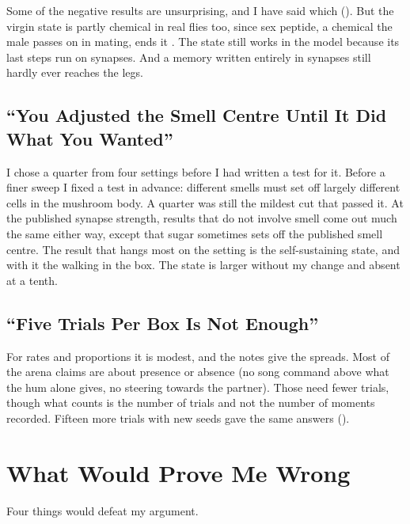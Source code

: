 Some of the negative results are unsurprising, and I have said which (). But the virgin state is partly chemical in real flies too, since sex peptide, a chemical the male passes on in mating, ends it \citep{feng2014ascending}. The state still works in the model because its last steps run on synapses. And a memory written entirely in synapses still hardly ever reaches the legs.

\subsection{``You Adjusted the Smell Centre Until It Did What You Wanted''}

I chose a quarter from four settings before I had written a test for it. Before a finer sweep I fixed a test in advance: different smells must set off largely different cells in the mushroom body. A quarter was still the mildest cut that passed it. At the published synapse strength, results that do not involve smell come out much the same either way, except that sugar sometimes sets off the published smell centre. The result that hangs most on the setting is the self-sustaining state, and with it the walking in the box. The state is larger without my change and absent at a tenth.

\subsection{``Five Trials Per Box Is Not Enough''}

For rates and proportions it is modest, and the notes give the spreads. Most of the arena claims are about presence or absence (no song command above what the hum alone gives, no steering towards the partner). Those need fewer trials, though what counts is the number of trials and not the number of moments recorded. Fifteen more trials with new seeds gave the same answers ().

\section{What Would Prove Me Wrong}
\label{sec:refutation}

Four things would defeat my argument.

